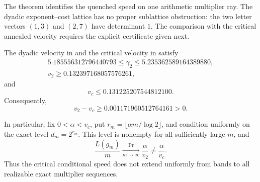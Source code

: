 \begin{remark}
The theorem identifies the quenched speed on one arithmetic multiplier ray.
The dyadic exponent--cost lattice has no proper sublattice obstruction:
the two letter vectors \((1,3)\) and \((2,7)\) have determinant \(1\).
The comparison with the critical annealed velocity requires the explicit
certificate given next.
\end{remark}

\begin{theorem}
\label{thm:strict-speed-separation}
The dyadic velocity in  and the critical
velocity in  satisfy
\begin{equation}
 \begin{gathered}
  5.185556312796440793\le\gamma_2
  \le5.235362589164389880,\\
  v_2\ge0.132397168057576261,
 \end{gathered}
 \label{eq:dyadic-speed-certificate}
\end{equation}
and
\begin{equation}
 v_c\le0.131225207544812100.
 \label{eq:critical-speed-certificate}
\end{equation}
Consequently,
\begin{equation}
 v_2-v_c\ge0.001171960512764161>0.
 \label{eq:strict-speed-separation}
\end{equation}

In particular, fix \(0<\alpha<v_c\), put
\(r_m=\lfloor\alpha m/\log2\rfloor\), and condition uniformly on the exact
level \(d_m=2^{r_m}\).  This level is nonempty for all sufficiently large
\(m\), and
\begin{equation}
 \frac{L(g_m)}m\xrightarrow[m\to\infty]{\Pr}
 \frac{\alpha}{v_2}\ne\frac{\alpha}{v_c}.
 \label{eq:dyadic-uniform-speed-counterexample}
\end{equation}
Thus the critical conditional speed does not extend uniformly from bands to
all realizable exact multiplier sequences.
\end{theorem}

